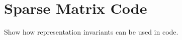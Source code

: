 \documentclass[11pt,conference]{IEEEtran}
\begin{document}
\section{Sparse Matrix Code}

Show how representation invariants can be used in code.



\end{document}
